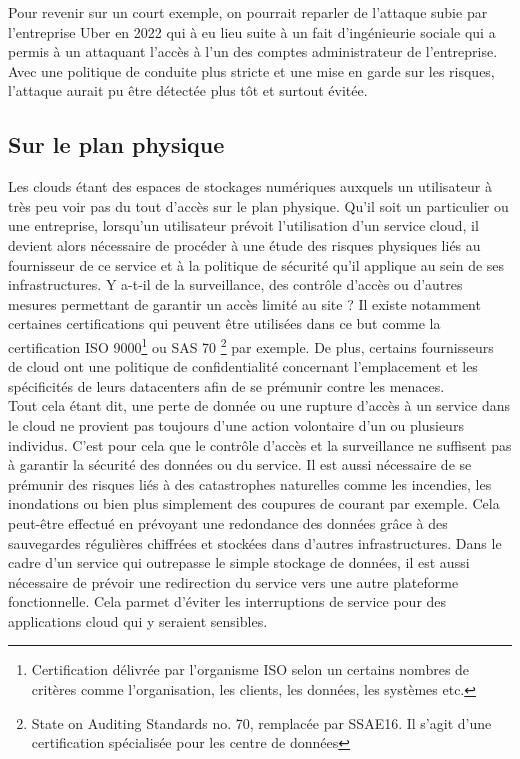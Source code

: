 \documentclass[a4paper, 12pt]{article}
\begin{document}
      Pour revenir sur un court exemple, on pourrait reparler de l'attaque 
      subie par l'entreprise Uber en 2022 qui à eu lieu suite à un fait 
      d'ingénieurie sociale qui a permis à un attaquant l'accès à l'un des 
      comptes administrateur de l'entreprise. Avec une politique de conduite 
      plus stricte et une mise en garde sur les risques, l'attaque aurait pu 
      être détectée plus tôt et surtout évitée. \\

    \subsection{Sur le plan physique}
      Les clouds étant des espaces de stockages numériques auxquels un
      utilisateur à très peu voir pas du tout d'accès sur le plan physique.
      Qu'il soit un particulier ou une entreprise, lorsqu'un utilisateur
      prévoit l'utilisation d'un service cloud, il devient alors nécessaire de
      procéder à une étude des risques physiques liés au fournisseur de
      ce service et à la politique de sécurité qu'il applique au sein de ses
      infrastructures. Y a-t-il de la surveillance, des contrôle d'accès ou
      d'autres mesures permettant de garantir un accès limité au site ? Il
      existe notamment certaines certifications qui peuvent être utilisées dans
      ce but comme la certification ISO 9000\footnote{Certification délivrée
      par l'organisme ISO selon un certains nombres de critères comme
      l'organisation, les clients, les données, les systèmes etc.} ou SAS 70
      \footnote{State on Auditing Standards no. 70, remplacée par SSAE16. Il
      s'agit d'une certification spécialisée pour les centre de données} par
      exemple. De plus, certains fournisseurs de cloud ont une politique de 
      confidentialité concernant l'emplacement et les spécificités de leurs 
      datacenters afin de se prémunir contre les menaces. \\

      Tout cela étant dit, une perte de donnée ou une rupture d'accès à un
      service dans le cloud ne provient pas toujours d'une action volontaire
      d'un ou plusieurs individus. C'est pour cela que le contrôle d'accès et
      la surveillance ne suffisent pas à garantir la sécurité des données ou
      du service. Il est aussi nécessaire de se prémunir des risques liés à des
      catastrophes naturelles comme les incendies, les inondations ou bien
      plus simplement des coupures de courant par exemple. Cela peut-être
      effectué en prévoyant une redondance des données grâce à des sauvegardes
      régulières chiffrées et stockées dans d'autres infrastructures. Dans le
      cadre d'un service qui outrepasse le simple stockage de données, il est
      aussi nécessaire de prévoir une redirection du service vers une autre
      plateforme fonctionnelle. Cela parmet d'éviter les interruptions de
      service pour des applications cloud qui y seraient sensibles.
\end{document}
